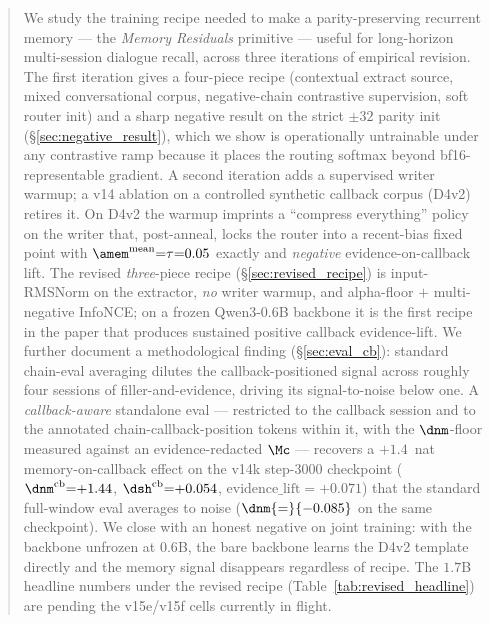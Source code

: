 %
%

\begin{abstract}
We study the training recipe needed to make a parity-preserving
recurrent memory --- the \emph{Memory Residuals} primitive ---
useful for long-horizon multi-session dialogue recall, across three
iterations of empirical revision. The first iteration gives a
four-piece recipe (contextual extract source, mixed conversational
corpus, negative-chain contrastive supervision, soft router init)
and a sharp negative result on the strict $\pm 32$ parity init
(\S\ref{sec:negative_result}), which we show is operationally
untrainable under any contrastive ramp because it places the
routing softmax beyond bf16-representable gradient. A second
iteration adds a supervised writer warmup; a v14 ablation on a
controlled synthetic callback corpus (D4v2) retires it. On D4v2 the
warmup imprints a ``compress everything'' policy on the writer
that, post-anneal, locks the router into a recent-bias fixed point
with $\amem^{\text{mean}}{=}\tau{=}0.05$ exactly and \emph{negative}
evidence-on-callback lift. The revised \emph{three}-piece recipe
(\S\ref{sec:revised_recipe}) is input-RMSNorm on the extractor,
\emph{no} writer warmup, and alpha-floor $+$ multi-negative
InfoNCE; on a frozen Qwen3-0.6B backbone it is the first recipe in
the paper that produces sustained positive callback evidence-lift.
We further document a methodological finding (\S\ref{sec:eval_cb}):
standard chain-eval averaging dilutes the callback-positioned
signal across roughly four sessions of filler-and-evidence, driving
its signal-to-noise below one. A \emph{callback-aware} standalone
eval --- restricted to the callback session and to the annotated
chain-callback-position tokens within it, with the $\dnm$-floor
measured against an evidence-redacted $\Mc$ --- recovers a
$+1.4$~nat memory-on-callback effect on the v14k step-$3000$
checkpoint
($\dnm^{\text{cb}}{=}{+1.44}$,
 $\dsh^{\text{cb}}{=}{+0.054}$,
 $\text{evidence\_lift}{=}{+0.071}$)
that the standard full-window eval averages to noise
($\dnm{=}{-0.085}$ on the same checkpoint). We close with an honest
negative on joint training: with the backbone unfrozen at $0.6$B,
the bare backbone learns the D4v2 template directly and the memory
signal disappears regardless of recipe. The $1.7$B headline numbers
under the revised recipe (Table~\ref{tab:revised_headline}) are
pending the v15e/v15f cells currently in flight.
\end{abstract}
